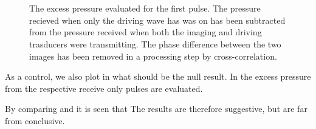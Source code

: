 \begin{figure}[t]%
  \centering
 \quad
  \subfloat[2nd pulse - 150]{
    \label{fig:exp:2nd:av:time:150:comp:control:cross:full}
    }\\
 \quad
  \subfloat[2nd pulse - 150]{
    \label{fig:exp:2nd:av:time:150:comp:control:cross:full}
    }\\
\caption{
    The excess pressure evaluated for the first pulse.  
    The pressure recieved when only the driving wave has was on has been subtracted from the pressure received when both the imaging and driving trasducers were transmitting.
    The phase difference between the two images has been removed in a processing step by cross-correlation.
  }
  \label{fig:exp:av:time:comp:control:cross:long:null}
\end{figure}

As a control, 
we also plot in  what should be the null result.
In 
the excess pressure from the respective receive only pulses are evaluated.

By comparing  and 
it is seen that
The results are therefore suggestive,
but are far from conclusive.

